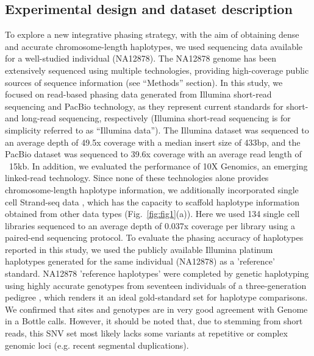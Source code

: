 \subsection{Experimental design and dataset description}
	To explore a new integrative phasing strategy, with the aim of obtaining dense and accurate chromosome-length haplotypes, we used sequencing data available for a well-studied individual (NA12878). 
	The NA12878 genome has been extensively sequenced using multiple technologies, providing high-coverage public sources of sequence information (see “Methods” section). 	
	In this study, we focused on read-based phasing data generated from Illumina short-read sequencing and PacBio technology, as they represent current standards for short- and long-read sequencing, 
	respectively (Illumina short-read sequencing is for simplicity referred to as “Illumina data”). 
	The Illumina dataset was sequenced to an average depth of 49.5x coverage with a median insert size of 433bp, and the PacBio dataset was sequenced to 39.6x coverage with an average read length of ~15kb.
	In addition, we evaluated the performance of 10X Genomics, an emerging linked-read technology. Since none of these technologies alone provides chromosome-length haplotype information, 
	we additionally incorporated single cell Strand-seq data \citep{Porubsky2016}, which has the capacity to scaffold haplotype information obtained from other data types (Fig.~\ref{fig:fig1}(a)). 
	Here we used 134 single cell libraries sequenced to an average depth of 0.037x coverage per library using a paired-end sequencing protocol. 
	To evaluate the phasing accuracy of haplotypes reported in this study, we used the publicly available Illumina platinum haplotypes generated for the same individual (NA12878) as a 'reference' standard.
	NA12878 'reference haplotypes’ were completed by genetic haplotyping using highly accurate genotypes from seventeen individuals of a three-generation pedigree \citep{eberle2017reference}, which renders it an ideal gold-standard set for haplotype comparisons. 
	We confirmed that sites and genotypes are in very good agreement with Genome in a Bottle calls.
	However, it should be noted that, due to stemming from short reads, this SNV set most likely lacks some variants at repetitive or complex genomic loci (e.g. recent segmental duplications).

